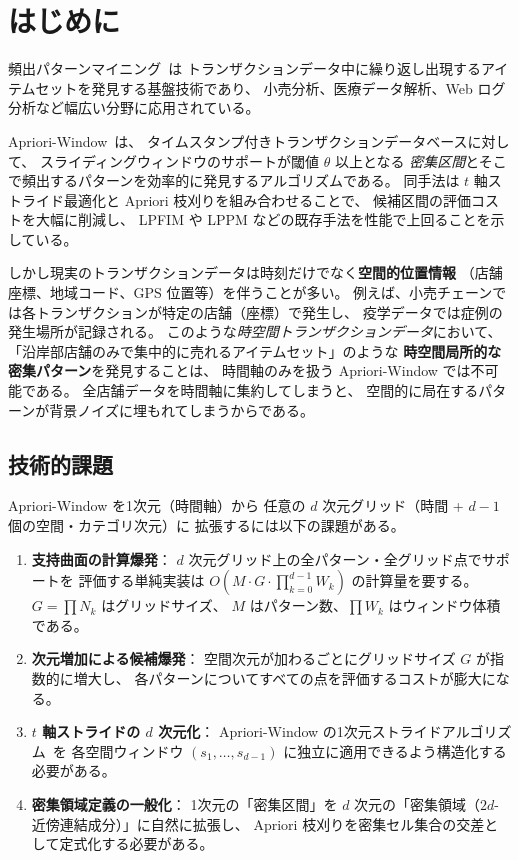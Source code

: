 \section{はじめに}\label{sec:intro}

頻出パターンマイニング~\cite{agrawal1994apriori,han2000mining}は
トランザクションデータ中に繰り返し出現するアイテムセットを発見する基盤技術であり、
小売分析、医療データ解析、Web ログ分析など幅広い分野に応用されている。

Apriori-Window~\cite{aprioriwindow}は、
タイムスタンプ付きトランザクションデータベースに対して、
スライディングウィンドウのサポートが閾値 $\theta$ 以上となる
\emph{密集区間}とそこで頻出するパターンを効率的に発見するアルゴリズムである。
同手法は $t$ 軸ストライド最適化と Apriori 枝刈りを組み合わせることで、
候補区間の評価コストを大幅に削減し、
LPFIM や LPPM などの既存手法を性能で上回ることを示している。

しかし現実のトランザクションデータは時刻だけでなく\textbf{空間的位置情報}
（店舗座標、地域コード、GPS 位置等）を伴うことが多い。
例えば、小売チェーンでは各トランザクションが特定の店舗（座標）で発生し、
疫学データでは症例の発生場所が記録される。
このような\emph{時空間トランザクションデータ}において、
「沿岸部店舗のみで集中的に売れるアイテムセット」のような
\textbf{時空間局所的な密集パターン}を発見することは、
時間軸のみを扱う Apriori-Window では不可能である。
全店舗データを時間軸に集約してしまうと、
空間的に局在するパターンが背景ノイズに埋もれてしまうからである。

\subsection{技術的課題}

Apriori-Window を1次元（時間軸）から
任意の $d$ 次元グリッド（時間 + $d{-}1$ 個の空間・カテゴリ次元）に
拡張するには以下の課題がある。

\begin{enumerate}
\item \textbf{支持曲面の計算爆発}：
$d$ 次元グリッド上の全パターン・全グリッド点でサポートを
評価する単純実装は $O(M \cdot G \cdot \prod_{k=0}^{d-1} W_k)$ の計算量を要する。
$G = \prod N_k$ はグリッドサイズ、
$M$ はパターン数、$\prod W_k$ はウィンドウ体積である。

\item \textbf{次元増加による候補爆発}：
空間次元が加わるごとにグリッドサイズ $G$ が指数的に増大し、
各パターンについてすべての点を評価するコストが膨大になる。

\item \textbf{$t$ 軸ストライドの $d$ 次元化}：
Apriori-Window の1次元ストライドアルゴリズム~\cite{aprioriwindow}を
各空間ウィンドウ $(s_1, \ldots, s_{d-1})$ に独立に適用できるよう構造化する必要がある。

\item \textbf{密集領域定義の一般化}：
1次元の「密集区間」を $d$ 次元の「密集領域（$2d$-近傍連結成分）」に自然に拡張し、
Apriori 枝刈りを密集セル集合の交差として定式化する必要がある。
\end{enumerate}

